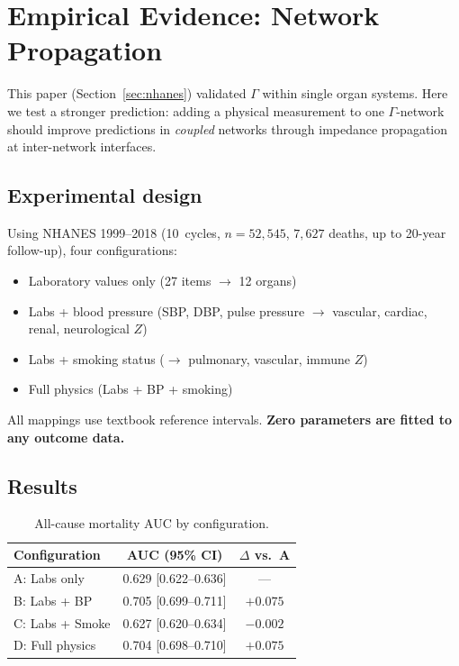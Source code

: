 \documentclass[aps,pre,twocolumn,superscriptaddress,floatfix]{revtex4-2}
\begin{document}
\section{Empirical Evidence: Network Propagation}
\label{sec:propagation}

This paper (Section~\ref{sec:nhanes}) validated $\Gamma$
within single organ systems.
Here we test a stronger prediction: adding a physical
measurement to one $\Gamma$-network should improve
predictions in \emph{coupled} networks through
impedance propagation at inter-network interfaces.

\subsection{Experimental design}

Using NHANES 1999--2018 (10~cycles, $n = 52{,}545$,
$7{,}627$ deaths, up to 20-year follow-up), four
configurations:
\begin{itemize}
  \item[A] Laboratory values only (27 items $\to$ 12 organs)
  \item[B] Labs + blood pressure (SBP, DBP, pulse pressure
    $\to$ vascular, cardiac, renal, neurological $Z$)
  \item[C] Labs + smoking status
    ($\to$ pulmonary, vascular, immune $Z$)
  \item[D] Full physics (Labs + BP + smoking)
\end{itemize}
All mappings use textbook reference intervals.
\textbf{Zero parameters are fitted to any outcome data.}

\subsection{Results}

\begin{table}[h]
\centering
\caption{All-cause mortality AUC by configuration.}
\label{tab:allcause}
\begin{tabular}{lcc}
\toprule
Configuration & AUC (95\% CI) & $\Delta$ vs.\ A \\
\midrule
A: Labs only    & 0.629 [0.622--0.636] & --- \\
B: Labs + BP    & 0.705 [0.699--0.711] & $+0.075$ \\
C: Labs + Smoke & 0.627 [0.620--0.634] & $-0.002$ \\
D: Full physics & 0.704 [0.698--0.710] & $+0.075$ \\
\bottomrule
\end{tabular}
\end{table}
\end{document}
